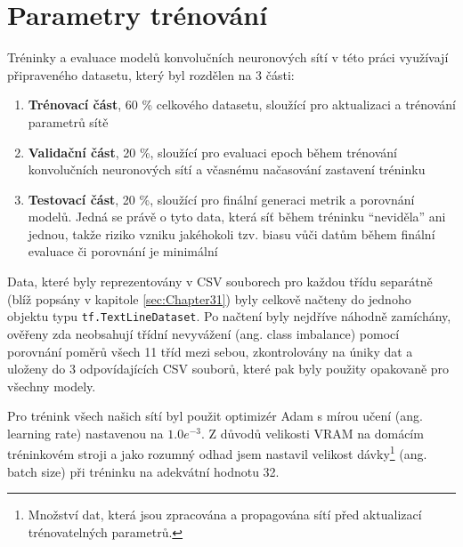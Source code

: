 \section{Parametry trénování}
\label{sec:Chapter54}
Tréninky a evaluace modelů konvolučních neuronových sítí v této práci využívají připraveného datasetu, který byl rozdělen na 3 části:
\begin{enumerate}
    \item \textbf{Trénovací část}, 60 \% celkového datasetu, sloužící pro aktualizaci a trénování parametrů sítě
    \item \textbf{Validační část}, 20 \%, sloužící pro evaluaci epoch během trénování konvolučních neuronových sítí a včasnému načasování zastavení tréninku
    \item \textbf{Testovací část}, 20 \%, sloužící pro finální generaci metrik a porovnání modelů. Jedná se právě o tyto data, která síť během tréninku ``neviděla'' ani jednou, takže riziko vzniku jakéhokoli tzv. biasu vůči datům během finální evaluace či porovnání je minimální
\end{enumerate}

Data, které byly reprezentovány v CSV souborech pro každou třídu separátně (blíž popsány v kapitole \ref{sec:Chapter31}) byly celkově načteny do jednoho objektu typu \texttt{tf.TextLineDataset}. Po načtení byly nejdříve náhodně zamíchány, ověřeny zda neobsahují třídní nevyvážení (ang. class imbalance) pomocí porovnání poměrů všech 11 tříd mezi sebou, zkontrolovány na úniky dat a uloženy do 3 odpovídajících CSV souborů, které pak byly použity opakovaně pro všechny modely.

Pro trénink všech našich sítí byl použit optimizér Adam s mírou učení (ang. learning rate) nastavenou na $1.0e^{-3}$. Z důvodů velikosti VRAM na domácím tréninkovém stroji a jako rozumný odhad jsem nastavil velikost dávky\footnote{Množství dat, která jsou zpracována a propagována sítí před aktualizací trénovatelných parametrů.} (ang. batch size) při tréninku na adekvátní hodnotu 32.

\endinput